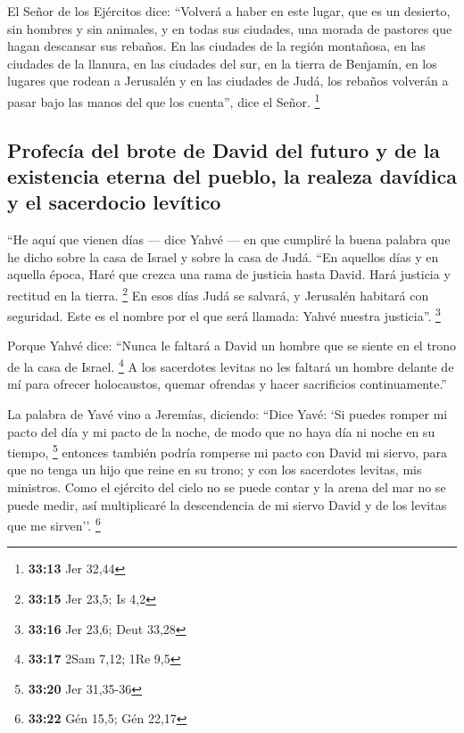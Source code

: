  El Señor de los Ejércitos dice: ``Volverá a haber en
este lugar, que es un desierto, sin hombres y sin animales, y en todas
sus ciudades, una morada de pastores que hagan descansar sus rebaños.
 En las ciudades de la región montañosa, en las ciudades
de la llanura, en las ciudades del sur, en la tierra de Benjamín, en los
lugares que rodean a Jerusalén y en las ciudades de Judá, los rebaños
volverán a pasar bajo las manos del que los cuenta'', dice el Señor.
\footnote{\textbf{33:13} Jer 32,44}

\hypertarget{profecuxeda-del-brote-de-david-del-futuro-y-de-la-existencia-eterna-del-pueblo-la-realeza-davuxeddica-y-el-sacerdocio-levuxedtico}{%
\subsection{Profecía del brote de David del futuro y de la existencia
eterna del pueblo, la realeza davídica y el sacerdocio
levítico}\label{profecuxeda-del-brote-de-david-del-futuro-y-de-la-existencia-eterna-del-pueblo-la-realeza-davuxeddica-y-el-sacerdocio-levuxedtico}}

 ``He aquí que vienen días --- dice Yahvé --- en que
cumpliré la buena palabra que he dicho sobre la casa de Israel y sobre
la casa de Judá.  ``En aquellos días y en aquella época,
Haré que crezca una rama de justicia hasta David. Hará justicia y
rectitud en la tierra. \footnote{\textbf{33:15} Jer 23,5; Is 4,2}
 En esos días Judá se salvará, y Jerusalén habitará con
seguridad. Este es el nombre por el que será llamada: Yahvé nuestra
justicia''. \footnote{\textbf{33:16} Jer 23,6; Deut 33,28}

 Porque Yahvé dice: ``Nunca le faltará a David un hombre
que se siente en el trono de la casa de Israel. \footnote{\textbf{33:17}
  2Sam 7,12; 1Re 9,5}  A los sacerdotes levitas no les
faltará un hombre delante de mí para ofrecer holocaustos, quemar
ofrendas y hacer sacrificios continuamente.''

 La palabra de Yavé vino a Jeremías, diciendo:
 ``Dice Yavé: `Si puedes romper mi pacto del día y mi
pacto de la noche, de modo que no haya día ni noche en su tiempo,
\footnote{\textbf{33:20} Jer 31,35-36}  entonces también
podría romperse mi pacto con David mi siervo, para que no tenga un hijo
que reine en su trono; y con los sacerdotes levitas, mis ministros.
 Como el ejército del cielo no se puede contar y la arena
del mar no se puede medir, así multiplicaré la descendencia de mi siervo
David y de los levitas que me sirven''. \footnote{\textbf{33:22} Gén
  15,5; Gén 22,17}

